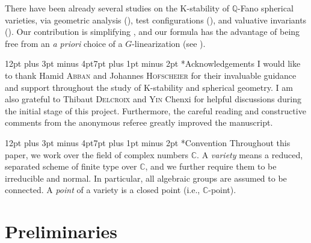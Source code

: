 \documentclass[11pt, oneside]{amsart}
\makeatletter
\newcommand{\<}{\left\langle} \renewcommand{\>}{\right\rangle}
\renewcommand{\subsection}{\@startsection{subsection}{2}{\z@}%
  {12pt plus 3pt minus 4pt}{7pt plus 1pt minus 2pt}%
  {\normalfont\bfseries}}
\renewcommand{\div}{\bug}
\let\origcontentsline\addcontentsline
\newcommand\resumetoc{\let\addcontentsline\origcontentsline}
\makeatother
\begin{document}
There have been already several studies on the K-stability of $\mathbb{Q}$-Fano spherical varieties, via geometric analysis (\cite{Delcroix_Kst_Fano_spher}), test configurations (\cite{LLW_wei_Kst_Fano_sph}), and valuative invariants (\cite{Yin_valu_lin_sph}). Our contribution is simplifying \cite[Theorem 4.1]{Yin_valu_lin_sph}, and our formula has the advantage of being free from an \textit{a priori} choice of a $G$-linearization (see ).

\subsection*{Acknowledgements}
I would like to thank Hamid \textsc{Abban} and Johannes \textsc{Hofscheier} for their invaluable guidance and support throughout the study of K-stability and spherical geometry. I am also grateful to Thibaut \textsc{Delcroix} and \textsc{Yin} Chenxi for helpful discussions during the initial stage of this project. Furthermore, the careful reading and constructive comments from the anonymous referee greatly improved the manuscript.

\subsection*{Convention}
Throughout this paper, we work over the field of complex numbers $\mathbb{C}$. A \emph{variety} means a reduced, separated scheme of finite type over $\mathbb{C}$, and we further require them to be irreducible and normal. In particular, all algebraic groups are assumed to be connected.
% 
A \emph{point} of a variety is a closed point (i.e., $\mathbb{C}$-point).


  \resumetoc
\endgroup

\section{Preliminaries}\label{sec:prelim}

\newcommand{\id}{\textrm{id}}
\newcommand{\stsh}{\mathcal{O}}
\renewcommand{\div}{\mathrm{div}}
\newcommand{\vol}{\mathrm{vol}}

\newcommand{\Div}{\mathrm{Div}}
\newcommand{\CDiv}{\mathrm{CDiv}}

\newcommand{\ord}{\mathrm{ord}}

\newcommand{\bc}{\mathrm{bar}}

\newcommand{\Pic}{\mathrm{Pic}}
\end{document}
